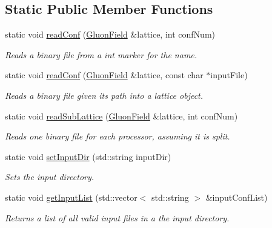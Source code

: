 \subsection*{Static Public Member Functions}
\begin{DoxyCompactItemize}
\item 
static void \hyperlink{classLatticeIO_1_1InputConf_a70d70bfdc0252ddaa3d2bcd472590982}{read\+Conf} (\hyperlink{field_8h_afe80b127697eba6d6e7fbd8121c8d4ee}{Gluon\+Field} \&lattice, int conf\+Num)
\begin{DoxyCompactList}\small\item\em Reads a binary file from a int marker for the name. \end{DoxyCompactList}\item 
static void \hyperlink{classLatticeIO_1_1InputConf_aed71fc3df1e2a9999e4466b5eefdf723}{read\+Conf} (\hyperlink{field_8h_afe80b127697eba6d6e7fbd8121c8d4ee}{Gluon\+Field} \&lattice, const char $\ast$input\+File)
\begin{DoxyCompactList}\small\item\em Reads a binary file given its path into a lattice object. \end{DoxyCompactList}\item 
static void \hyperlink{classLatticeIO_1_1InputConf_a9f84f6832fdeb2c6b31a2598c73374b7}{read\+Sub\+Lattice} (\hyperlink{field_8h_afe80b127697eba6d6e7fbd8121c8d4ee}{Gluon\+Field} \&lattice, int conf\+Num)\hypertarget{classLatticeIO_1_1InputConf_a9f84f6832fdeb2c6b31a2598c73374b7}{}\label{classLatticeIO_1_1InputConf_a9f84f6832fdeb2c6b31a2598c73374b7}

\begin{DoxyCompactList}\small\item\em Reads one binary file for each processor, assuming it is split. \end{DoxyCompactList}\item 
static void \hyperlink{classLatticeIO_1_1InputConf_a49a84ce29fc32889d6c356c3afd09b71}{set\+Input\+Dir} (std\+::string input\+Dir)
\begin{DoxyCompactList}\small\item\em Sets the input directory. \end{DoxyCompactList}\item 
static void \hyperlink{classLatticeIO_1_1InputConf_a16b06fe98129e3c1e80879fa9cad43a9}{get\+Input\+List} (std\+::vector$<$ std\+::string $>$ \&input\+Conf\+List)
\begin{DoxyCompactList}\small\item\em Returns a list of all valid input files in a the input directory. \end{DoxyCompactList}\end{DoxyCompactItemize}
